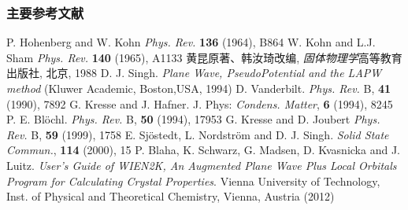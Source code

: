 \documentclass[cjk,slidestop,compress,mathserif,blue]{beamer}
\begin{document}
\appendix
\begin{thebibliography}{99}
\frame
{
\frametitle{主要参考文献}
{\small
{}\textrm{P. Hohenberg and W. Kohn \textit{Phys. Rev.} \textbf{136} (1964), B864}
\textrm{W. Kohn and L.J. Sham \textit{Phys. Rev.} \textbf{140} (1965), A1133}
黄昆\:原著、韩汝琦\:改编, {\textit{固体物理学}}\:高等教育出版社, 北京, 1988
\textrm{D. J. Singh. \textit{Plane Wave, PseudoPotential and the LAPW method} (Kluwer Academic, Boston,USA, 1994)}
\textrm{D. Vanderbilt. \textit{Phys. Rev.} B, \textbf{41} (1990), 7892} 
\textrm{G. Kresse and J. Hafner. J. Phys: \textit{Condens. Matter}, \textbf{6} (1994), 8245}
\textrm{P. E. Bl\"ochl. \textit{Phys. Rev.} B, \textbf{50} (1994), 17953}
\textrm{G. Kresse and D. Joubert \textit{Phys. Rev.} B, \textbf{59} (1999), 1758}
\textrm{E. Sj\"ostedt, L. Nordstr\"om and D. J. Singh. \textit{Solid State Commun.}, \textbf{114} (2000), 15}
\textrm{P. Blaha, K. Schwarz, G. Madsen, D. Kvasnicka and J. Luitz. \textit{User's Guide of WIEN2K, An Augmented Plane Wave Plus Local Orbitals Program for Calculating Crystal Properties}. Vienna University of Technology, Inst. of Physical and Theoretical Chemistry, Vienna, Austria (2012)}
\nocite*{}
}
}


\end{thebibliography}
\end{document}
